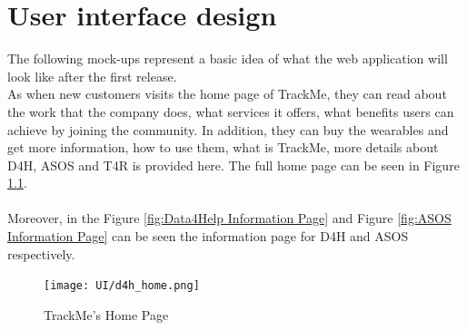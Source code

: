 \documentclass[a4paper, hidelinks, 12pt]{report}
\begin{document}
	\chapter{User interface design}
	The following mock-ups represent a basic idea of what the web application will look like after the first release.\\
	As when new customers visits the home page of TrackMe, they can read about the work that the company does, what services it offers, what benefits users can achieve by joining the community. In addition, they can buy the wearables and get more information, how to use them, what is TrackMe, more details about D4H, ASOS and T4R is provided here. The full home page can be seen in Figure \ref{fig:Home_Page}. \\\\
	Moreover, in the Figure \ref{fig:Data4Help Information Page} and Figure \ref{fig:ASOS Information Page} can be seen the information page for D4H and ASOS respectively.
	
	\begin{figure}[H]
		\centering
		\texttt{[image: UI/d4h\_home.png]}
		\caption[UI: TrackMe's Home Page]{TrackMe's Home Page}
		\label{fig:Home_Page}
	\end{figure}
	
\end{document}
